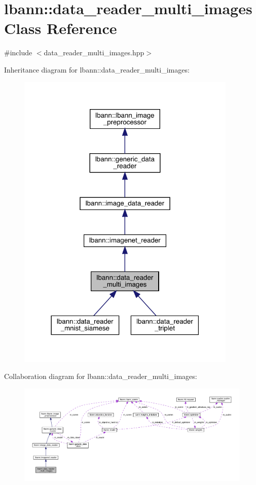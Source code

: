 \hypertarget{classlbann_1_1data__reader__multi__images}{}\section{lbann\+:\+:data\+\_\+reader\+\_\+multi\+\_\+images Class Reference}
\label{classlbann_1_1data__reader__multi__images}


{\ttfamily \#include $<$data\+\_\+reader\+\_\+multi\+\_\+images.\+hpp$>$}



Inheritance diagram for lbann\+:\+:data\+\_\+reader\+\_\+multi\+\_\+images\+:\nopagebreak
\begin{figure}[H]
\begin{center}
\leavevmode
\includegraphics[width=298pt]{classlbann_1_1data__reader__multi__images__inherit__graph}
\end{center}
\end{figure}


Collaboration diagram for lbann\+:\+:data\+\_\+reader\+\_\+multi\+\_\+images\+:\nopagebreak
\begin{figure}[H]
\begin{center}
\leavevmode
\includegraphics[width=350pt]{classlbann_1_1data__reader__multi__images__coll__graph}
\end{center}
\end{figure}
